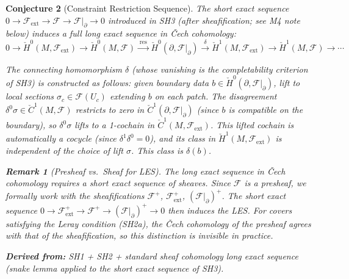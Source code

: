\documentclass[11pt,letterpaper]{article}
\newtheorem{conjecture}{Conjecture}[section]
\newtheorem{remark}[conjecture]{Remark}
\newcommand{\Cech}{\check{C}}
\newcommand{\Hcech}{\check{H}}
\newcommand{\sheaf}{\mathcal{F}}
\begin{document}
\begin{conjecture}[Constraint Restriction 
Sequence]\label{conj:long_exact}
The short exact sequence $0 \to \sheaf_{\mathrm{ext}} \to \sheaf \to 
\sheaf|_{\partial} \to 0$ introduced in SH3 (after sheafification; 
see M4 note below) induces a full long exact sequence in \v{C}ech 
cohomology:
\begin{equation}\label{eq:long_exact}
    0 \to \Hcech^0(M, \sheaf_{\mathrm{ext}}) \to \Hcech^0(M, \sheaf) 
    \xrightarrow{\;\mathrm{res}\;} \Hcech^0(\partial, \sheaf|_\partial) 
    \xrightarrow{\;\delta\;} \Hcech^1(M, \sheaf_{\mathrm{ext}}) 
    \to \Hcech^1(M, \sheaf) \to \cdots
\end{equation}

The connecting homomorphism $\delta$ (whose vanishing is the 
completability criterion of SH3) is constructed as follows: given 
boundary data $b \in \Hcech^0(\partial, \sheaf|_\partial)$, lift to 
local sections $\sigma_c \in \sheaf(U_c)$ extending $b$ on each patch. 
The disagreement $\delta^0 \sigma \in \Cech^1(M, \sheaf)$ restricts 
to zero in $\Cech^1(\partial, \sheaf|_\partial)$ (since $b$ is 
compatible on the boundary), so $\delta^0 \sigma$ lifts to a 
1-cochain in $\Cech^1(M, \sheaf_{\mathrm{ext}})$. This lifted cochain 
is automatically a cocycle (since $\delta^1 \delta^0 = 0$), and its 
class in $\Hcech^1(M, \sheaf_{\mathrm{ext}})$ is independent of the 
choice of lift $\sigma$. This class is $\delta(b)$.

\begin{remark}[Presheaf vs.\ Sheaf for LES]\label{rem:les_sheaf}
The long exact sequence in \v{C}ech cohomology requires a short exact 
sequence of \emph{sheaves}. Since $\sheaf$ is a presheaf, we formally 
work with the sheafifications $\sheaf^+$, $\sheaf_{\mathrm{ext}}^+$, 
$(\sheaf|_\partial)^+$. The short exact sequence $0 \to 
\sheaf_{\mathrm{ext}}^+ \to \sheaf^+ \to (\sheaf|_\partial)^+ \to 0$ 
then induces the LES. For covers satisfying the Leray condition 
(SH2a), the \v{C}ech cohomology of the presheaf agrees with that 
of the sheafification, so this distinction is invisible in practice.
\end{remark}

\textbf{Derived from:} SH1 + SH2 + standard sheaf cohomology long 
exact sequence (snake lemma applied to the short exact sequence of 
SH3).


\end{conjecture}
\end{document}
